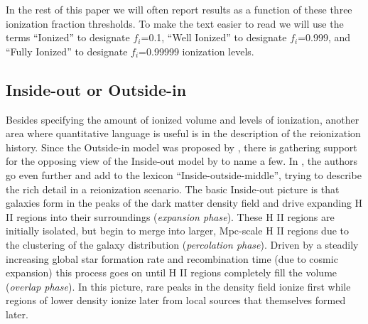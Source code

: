 
In the rest of this paper we will often report results as a function of these three ionization fraction thresholds. 
To make the text easier to read we will use the terms ``Ionized'' to designate $f_i$=0.1, ``Well Ionized'' to designate $f_i$=0.999, and ``Fully Ionized'' to designate $f_i$=0.99999 ionization levels.

\subsection{Inside-out or Outside-in}
\label{IOOI}

Besides specifying the amount of ionized volume and levels of ionization, another area where quantitative language is useful is in the description of the reionization history.  Since the Outside-in model was proposed by \cite{MiraldaEscudeEtAl2000}, there is gathering support for the opposing view of the Inside-out model by \cite{SokasianEtAl2003,FurlanettoEtAl2004,IlievEtAl2006} to name a few.  In \cite{FinlatorEtAl2009}, the authors go even further and add to the lexicon ``Inside-outside-middle'', trying to describe the rich detail in a reionization scenario. The basic Inside-out picture is that galaxies form in the peaks of the dark matter density field and drive expanding H {\footnotesize II} regions into their surroundings ({\em expansion phase}). 
These H {\footnotesize II} regions are initially isolated, but begin to merge into larger, Mpc-scale H {\footnotesize II} regions due to the clustering of the galaxy distribution ({\em percolation phase}). Driven by a steadily increasing global star formation rate and recombination time (due to cosmic expansion) this process goes on until H {\footnotesize II} regions completely fill the volume ({\em overlap phase}). In this picture, rare peaks in the density field ionize first while regions of lower density ionize later from local sources that themselves formed later. 


